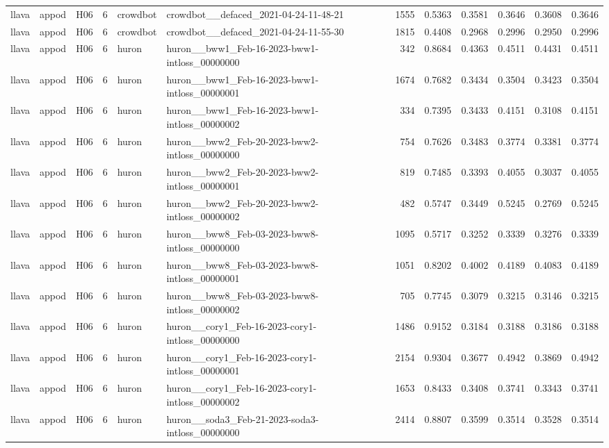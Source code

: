 \begin{table}[tbp]
\begin{tabular}{lllrllrrrrrr}
llava & appod & H06 & 6 & crowdbot & crowdbot\_\_defaced\_2021-04-24-11-48-21 & 1555 & 0.5363 & 0.3581 & 0.3646 & 0.3608 & 0.3646 \\
llava & appod & H06 & 6 & crowdbot & crowdbot\_\_defaced\_2021-04-24-11-55-30 & 1815 & 0.4408 & 0.2968 & 0.2996 & 0.2950 & 0.2996 \\
llava & appod & H06 & 6 & huron & huron\_\_bww1\_Feb-16-2023-bww1-intloss\_00000000 & 342 & 0.8684 & 0.4363 & 0.4511 & 0.4431 & 0.4511 \\
llava & appod & H06 & 6 & huron & huron\_\_bww1\_Feb-16-2023-bww1-intloss\_00000001 & 1674 & 0.7682 & 0.3434 & 0.3504 & 0.3423 & 0.3504 \\
llava & appod & H06 & 6 & huron & huron\_\_bww1\_Feb-16-2023-bww1-intloss\_00000002 & 334 & 0.7395 & 0.3433 & 0.4151 & 0.3108 & 0.4151 \\
llava & appod & H06 & 6 & huron & huron\_\_bww2\_Feb-20-2023-bww2-intloss\_00000000 & 754 & 0.7626 & 0.3483 & 0.3774 & 0.3381 & 0.3774 \\
llava & appod & H06 & 6 & huron & huron\_\_bww2\_Feb-20-2023-bww2-intloss\_00000001 & 819 & 0.7485 & 0.3393 & 0.4055 & 0.3037 & 0.4055 \\
llava & appod & H06 & 6 & huron & huron\_\_bww2\_Feb-20-2023-bww2-intloss\_00000002 & 482 & 0.5747 & 0.3449 & 0.5245 & 0.2769 & 0.5245 \\
llava & appod & H06 & 6 & huron & huron\_\_bww8\_Feb-03-2023-bww8-intloss\_00000000 & 1095 & 0.5717 & 0.3252 & 0.3339 & 0.3276 & 0.3339 \\
llava & appod & H06 & 6 & huron & huron\_\_bww8\_Feb-03-2023-bww8-intloss\_00000001 & 1051 & 0.8202 & 0.4002 & 0.4189 & 0.4083 & 0.4189 \\
llava & appod & H06 & 6 & huron & huron\_\_bww8\_Feb-03-2023-bww8-intloss\_00000002 & 705 & 0.7745 & 0.3079 & 0.3215 & 0.3146 & 0.3215 \\
llava & appod & H06 & 6 & huron & huron\_\_cory1\_Feb-16-2023-cory1-intloss\_00000000 & 1486 & 0.9152 & 0.3184 & 0.3188 & 0.3186 & 0.3188 \\
llava & appod & H06 & 6 & huron & huron\_\_cory1\_Feb-16-2023-cory1-intloss\_00000001 & 2154 & 0.9304 & 0.3677 & 0.4942 & 0.3869 & 0.4942 \\
llava & appod & H06 & 6 & huron & huron\_\_cory1\_Feb-16-2023-cory1-intloss\_00000002 & 1653 & 0.8433 & 0.3408 & 0.3741 & 0.3343 & 0.3741 \\
llava & appod & H06 & 6 & huron & huron\_\_soda3\_Feb-21-2023-soda3-intloss\_00000000 & 2414 & 0.8807 & 0.3599 & 0.3514 & 0.3528 & 0.3514 \\

\end{tabular}
\end{table}
